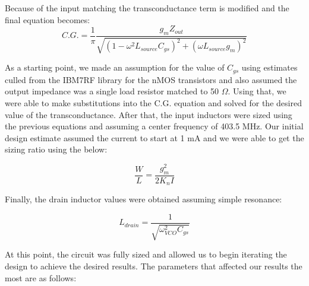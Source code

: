 Because of the input matching the transconductance term is modified and the final equation becomes:
\begin{equation}
C.G. = \frac{1}{\pi}\frac{g_{m}Z_{out}}{\sqrt{(1-\omega^{2}L_{source}C_{gs})^{2}+(\omega L_{source}g_{m})^{2}}}
\end{equation}

As a starting point, we made an assumption for the value of $C_{gs}$ using estimates culled from the IBM7RF library for the nMOS transistors and also assumed the output impedance was a single load resistor matched to 50 $\Omega$. Using that, we were able to make substitutions into the C.G. equation and solved for the desired value of the transconductance. After that, the input inductors were sized using the previous equations and assuming a center frequency of 403.5 MHz. Our initial design estimate assumed the current to start at 1 mA and we were able to get the sizing ratio using the below:

\begin{equation}
\frac{W}{L} = \frac{g_{m}^2}{2K_{n}I}
\end{equation}

Finally, the drain inductor values were obtained assuming simple resonance:

\begin{equation}
L_{drain} = \frac{1}{\sqrt{\omega^{2}_{VCO}C_{gs}}}
\end{equation}

At this point, the circuit was fully sized and allowed us to begin iterating the design to achieve the desired results.
The parameters that affected our results the most are as follows:

